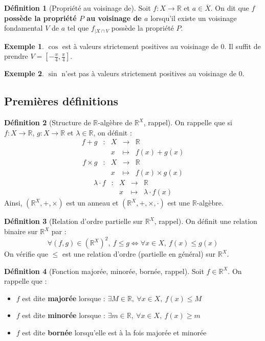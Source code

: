 \documentclass[french]{book}
\newcommand{\R}{\mathbb{R}}
\theoremstyle{plain}
\theoremstyle{definition}
\newtheorem{dfn}{Définition}[chapter]
\newtheorem{exa}{Exemple}[chapter]
\theoremstyle{remark}
\begin{document}
\begin{dfn}[Propriété au voisinage de]
	Soit $f:X\rightarrow\R$ et $a\in\overline{X}$. On dit que \textbf{$f$ possède la propriété $P$ au voisinage de $a$} lorsqu'il existe un voisinage fondamental $V$ de $a$ tel que $f_{|X\cap V}$ possède la propriété $P$.
\end{dfn}
\begin{exa}
	$\cos$ est à valeurs strictement positives au voisinage de $0$. Il suffit de prendre $V=\displaystyle\left[-\frac{\pi}{4},\frac{\pi}{4}\right]$.
\end{exa}
\begin{exa}
	$\sin$ n'est pas à valeurs strictement positives au voisinage de $0$.
\end{exa}
\subsection{Premières définitions}
\begin{dfn}[Structure de $\R$-algèbre de $\R^X$, rappel]
	On rappelle que si $f:X\rightarrow\R$, $g:X\rightarrow\R$ et $\lambda\in\R$, on définit : $$\begin{array}{ccccc}f+g&:&X&\rightarrow&\R\\&&x&\mapsto&f(x)+g(x)\end{array}$$
	$$\begin{array}{ccccc}f\times g&:&X&\rightarrow&\R\\&&x&\mapsto&f(x)\times g(x)\end{array}$$ $$\begin{array}{ccccc}\lambda\cdot f&:&X&\rightarrow&\R\\&&x&\mapsto&\lambda\cdot f(x)\end{array}$$ Ainsi, $(\R^X,+,\times)$ est un anneau et $(\R^X,+,\times,\cdot)$ est une $\R$-algèbre.
\end{dfn}
\begin{dfn}[Relation d'ordre partielle sur $\R^X$, rappel]
	On définit une relation binaire sur $\R^X$ par : $$\forall(f,g)\in(\R^X)^2,\ f\leqslant g\iff \forall x\in X,\ f(x)\leqslant g(x)$$ On vérifie que $\leqslant$ est une relation d'ordre (partielle en général) sur $\R^X$.
\end{dfn}
\begin{dfn}[Fonction majorée, minorée, bornée, rappel]
	Soit $f\in\R^X$. On rappelle que :
	\begin{itemize}
		\item $f$ est dite \textbf{majorée} lorsque : $\exists M\in\R,\ \forall x\in X,\ f(x)\leqslant M$
		\item $f$ est dite \textbf{minorée} lorsque : $\exists m\in\R,\ \forall x\in X,\ f(x)\geqslant m$
		\item $f$ est dite \textbf{bornée} lorsqu'elle est à la fois majorée et minorée
	\end{itemize}
\end{dfn}
\end{document}
